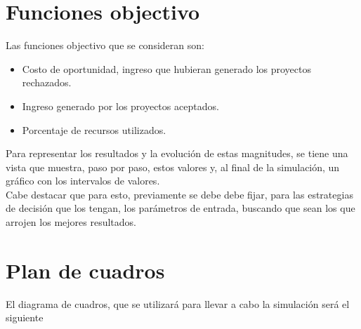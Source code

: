 \section{Funciones objectivo}
Las funciones objectivo que se consideran son:

\begin{itemize}
    \item Costo de oportunidad, ingreso que hubieran generado los proyectos rechazados.
    \item Ingreso generado por los proyectos aceptados.
    \item Porcentaje de recursos utilizados.
\end{itemize}

Para representar los resultados y la evolución de estas magnitudes, se tiene una vista que muestra, paso por paso, estos valores y, al final de la simulación, un
gráfico con los intervalos de valores. \\

Cabe destacar que para esto, previamente se debe debe fijar, para las estrategias de decisión que los tengan, los parámetros de entrada, buscando que sean los
que arrojen los mejores resultados.\\

\section{Plan de cuadros}

El diagrama de cuadros, que se utilizará para llevar a cabo la simulación será el siguiente

